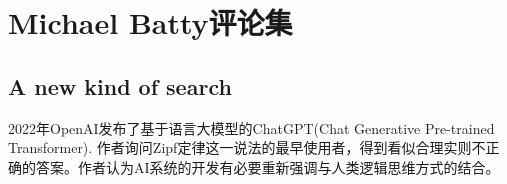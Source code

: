 \chapter{Michael Batty评论集}

\section{A new kind of search}

\par 2022年OpenAI发布了基于语言大模型的ChatGPT(Chat Generative Pre-trained Transformer). 作者询问Zipf定律这一说法的最早使用者，得到看似合理实则不正确的答案。作者认为AI系统的开发有必要重新强调与人类逻辑思维方式的结合。